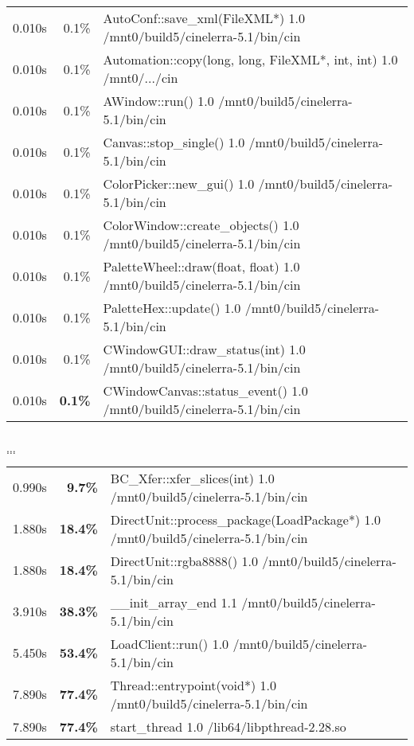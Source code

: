 \begin{tabular}{@{}rrl}
 0.010s & 0.1\% & AutoConf::save\_xml(FileXML*)   1.0 /mnt0/build5/cinelerra-5.1/bin/cin\\
 0.010s & 0.1\% & Automation::copy(long, long, FileXML*, int, int)   1.0 /mnt0/.../cin\\
 0.010s & 0.1\% & AWindow::run()             1.0 /mnt0/build5/cinelerra-5.1/bin/cin\\
 0.010s & 0.1\% & Canvas::stop\_single()      1.0 /mnt0/build5/cinelerra-5.1/bin/cin\\
 0.010s & 0.1\% & ColorPicker::new\_gui()     1.0 /mnt0/build5/cinelerra-5.1/bin/cin\\
 0.010s & 0.1\% & ColorWindow::create\_objects()   1.0 /mnt0/build5/cinelerra-5.1/bin/cin\\
 0.010s & 0.1\% & PaletteWheel::draw(float, float)   1.0 /mnt0/build5/cinelerra-5.1/bin/cin\\
 0.010s & 0.1\% & PaletteHex::update()       1.0 /mnt0/build5/cinelerra-5.1/bin/cin\\
 0.010s & 0.1\% & CWindowGUI::draw\_status(int)   1.0 /mnt0/build5/cinelerra-5.1/bin/cin\\
 0.010s & \textbf{0.1\%} & CWindowCanvas::status\_event()   1.0 /mnt0/build5/cinelerra-5.1/bin/cin\\
\end{tabular}\\
$\dots$\\
$\dots$\\
\begin{tabular}{@{}rrl}
 0.990s & \textbf{9.7\%} & BC\_Xfer::xfer\_slices(int)   1.0 /mnt0/build5/cinelerra-5.1/bin/cin\\
 1.880s & \textbf{18.4\%} & DirectUnit::process\_package(LoadPackage*)   1.0 /mnt0/build5/cinelerra-5.1/bin/cin\\
 1.880s & \textbf{18.4\%} & DirectUnit::rgba8888()     1.0 /mnt0/build5/cinelerra-5.1/bin/cin\\
 3.910s & \textbf{38.3\%} & \_\_init\_array\_end           1.1 /mnt0/build5/cinelerra-5.1/bin/cin\\
 5.450s & \textbf{53.4\%} & LoadClient::run()          1.0 /mnt0/build5/cinelerra-5.1/bin/cin\\
 7.890s & \textbf{77.4\%} & Thread::entrypoint(void*)   1.0 /mnt0/build5/cinelerra-5.1/bin/cin\\
 7.890s & \textbf{77.4\%} & start\_thread               1.0 /lib64/libpthread-2.28.so\\
\end{tabular}\\
